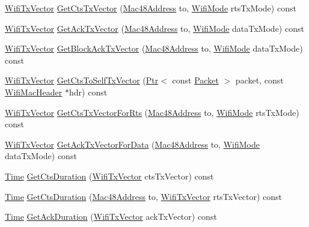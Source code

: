 \begin{DoxyCompactItemize}
\item 
\hyperlink{classns3_1_1WifiTxVector}{Wifi\+Tx\+Vector} \hyperlink{classns3_1_1MacLow_a7e8fb3caf4751fa39bc437cab3ac94f1}{Get\+Cts\+Tx\+Vector} (\hyperlink{classns3_1_1Mac48Address}{Mac48\+Address} to, \hyperlink{classns3_1_1WifiMode}{Wifi\+Mode} rts\+Tx\+Mode) const 
\item 
\hyperlink{classns3_1_1WifiTxVector}{Wifi\+Tx\+Vector} \hyperlink{classns3_1_1MacLow_aacb6b94de35df106b76d93b05d145d13}{Get\+Ack\+Tx\+Vector} (\hyperlink{classns3_1_1Mac48Address}{Mac48\+Address} to, \hyperlink{classns3_1_1WifiMode}{Wifi\+Mode} data\+Tx\+Mode) const 
\item 
\hyperlink{classns3_1_1WifiTxVector}{Wifi\+Tx\+Vector} \hyperlink{classns3_1_1MacLow_a6274c3c4a5b90a6f448cc45e89950255}{Get\+Block\+Ack\+Tx\+Vector} (\hyperlink{classns3_1_1Mac48Address}{Mac48\+Address} to, \hyperlink{classns3_1_1WifiMode}{Wifi\+Mode} data\+Tx\+Mode) const 
\item 
\hyperlink{classns3_1_1WifiTxVector}{Wifi\+Tx\+Vector} \hyperlink{classns3_1_1MacLow_a9602e7c5294878230767654b61e76e42}{Get\+Cts\+To\+Self\+Tx\+Vector} (\hyperlink{classns3_1_1Ptr}{Ptr}$<$ const \hyperlink{classns3_1_1Packet}{Packet} $>$ packet, const \hyperlink{classns3_1_1WifiMacHeader}{Wifi\+Mac\+Header} $\ast$hdr) const 
\item 
\hyperlink{classns3_1_1WifiTxVector}{Wifi\+Tx\+Vector} \hyperlink{classns3_1_1MacLow_a48d2394e5fab14a60af30b3d0a145d43}{Get\+Cts\+Tx\+Vector\+For\+Rts} (\hyperlink{classns3_1_1Mac48Address}{Mac48\+Address} to, \hyperlink{classns3_1_1WifiMode}{Wifi\+Mode} rts\+Tx\+Mode) const 
\item 
\hyperlink{classns3_1_1WifiTxVector}{Wifi\+Tx\+Vector} \hyperlink{classns3_1_1MacLow_ad023756670d1e2e69b9832968e4b7029}{Get\+Ack\+Tx\+Vector\+For\+Data} (\hyperlink{classns3_1_1Mac48Address}{Mac48\+Address} to, \hyperlink{classns3_1_1WifiMode}{Wifi\+Mode} data\+Tx\+Mode) const 
\item 
\hyperlink{classns3_1_1Time}{Time} \hyperlink{classns3_1_1MacLow_a51008d8954b33afd5ec805cda1a3c297}{Get\+Cts\+Duration} (\hyperlink{classns3_1_1WifiTxVector}{Wifi\+Tx\+Vector} cts\+Tx\+Vector) const 
\item 
\hyperlink{classns3_1_1Time}{Time} \hyperlink{classns3_1_1MacLow_a97137ac7e59a3637e5f71c38e36691ab}{Get\+Cts\+Duration} (\hyperlink{classns3_1_1Mac48Address}{Mac48\+Address} to, \hyperlink{classns3_1_1WifiTxVector}{Wifi\+Tx\+Vector} rts\+Tx\+Vector) const 
\item 
\hyperlink{classns3_1_1Time}{Time} \hyperlink{classns3_1_1MacLow_afb6684c2fedc5d0595a80b0f6e959065}{Get\+Ack\+Duration} (\hyperlink{classns3_1_1WifiTxVector}{Wifi\+Tx\+Vector} ack\+Tx\+Vector) const 

\end{DoxyCompactItemize}
